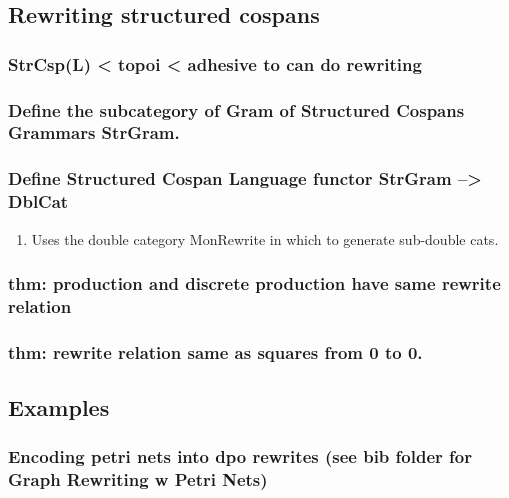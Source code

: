 \documentclass{amsart}
\theoremstyle{remark}
\theoremstyle{definition}
\begin{document}
{{%

\subsection{Rewriting structured cospans}
\label{sec-3-4}

\subsubsection{StrCsp(L) < topoi < adhesive to can do rewriting}
\label{sec-3-4-1}
\subsubsection{Define the subcategory of Gram of Structured Cospans Grammars StrGram.}
\label{sec-3-4-2}
\subsubsection{Define Structured Cospan Language functor StrGram --> DblCat}
\label{sec-3-4-3}
\begin{enumerate}
\item Uses the double category MonRewrite in which to generate sub-double cats.
\label{sec-3-4-3-1}
\end{enumerate}
\subsubsection{thm: production and discrete production have same rewrite relation}
\label{sec-3-4-4}
\subsubsection{thm: rewrite relation same as squares from 0 to 0.}
\label{sec-3-4-5}



\subsection{Examples}
\label{sec-3-5}
\subsubsection{Encoding petri nets into dpo rewrites (see bib folder for Graph Rewriting w Petri Nets)}
\label{sec-3-5-1}



}}
\end{document}
